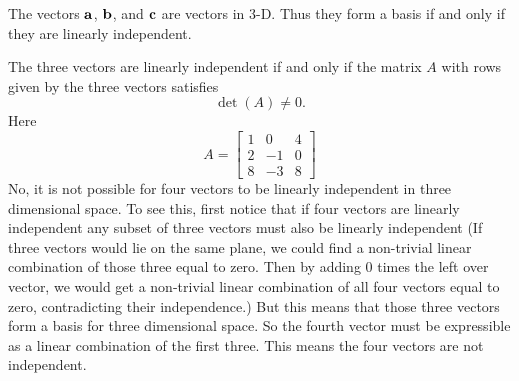 \vspace{2mm}
The vectors $\aa$, $\bb$, and $\cc$ are vectors in 3-D. Thus they form a basis if and only if they are linearly independent.

The three vectors are linearly independent if and only if the matrix $A$ with rows given by the three vectors satisfies
$$\det(A)\neq 0.$$
Here
$$
A = \left[\begin{array}{ccc} 1 & 0 & 4 \\ 2& -1 & 0 \\ 8 & -3 & 8 \end{array}\right]
$$
\vspace{2mm}
No, it is not possible for four vectors to be linearly independent in three
dimensional space. To see this, first notice that if four vectors are
linearly independent any subset of three  vectors
must also be linearly independent (If three vectors would lie on the same plane,
we could find a non-trivial linear combination of those three equal to zero.
Then by adding $0$ times the left over vector, we would get a non-trivial linear
combination of all four vectors equal to zero, contradicting their
independence.)
But this means that those three vectors form a basis for three
dimensional space. So the fourth vector must be expressible as a linear
combination of the first three. This means the four vectors are not independent.

